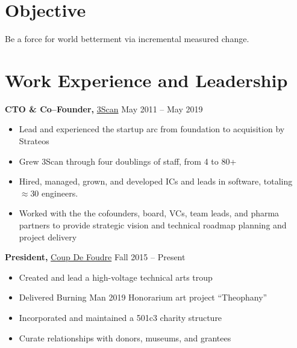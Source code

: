 \documentclass{res}
\begin{document}

\address{{\bf Home Address} \\ 166 Sanchez \#7 \\ San Francisco, CA 94114 \\
        (520) 591-5245 \\ meawoppl@gmail.com }
\address{{\bf Work Address} \\ 951 Hudson Ave \\ San Francisco, CA 94124 \\
        (562) 546-3326 \\ \href{https://meawoppl.github.io}{meawoppl.github.io}}

\begin{resume}

\section{Objective}
Be a force for world betterment via incremental measured change.

\section{Work Experience and Leadership}

{\bf CTO \& Co--Founder,} \href{http://www.3scan.com}{3Scan} \hfill
May 2011 -- May 2019
\begin{itemize}  \itemsep -2pt
  \item Lead and experienced the startup arc from foundation to acquisition by Strateos
  \item Grew 3Scan through four doublings of staff, from 4 to 80+
  \item Hired, managed, grown, and developed ICs and leads in software,
    totaling $\approx30$ engineers.
  \item Worked with the the cofounders, board, VCs, team leads, and pharma partners to provide strategic vision
    and technical roadmap planning and project delivery
\end{itemize}

{\bf President,}  \href{http://coupdefoud.re}{Coup De Foudre} \hfill   Fall 2015 -- Present
\begin{itemize} \itemsep -2pt
  \item Created and lead a high-voltage technical arts troup
  \item Delivered Burning Man 2019 Honorarium art project ``Theophany''
  \item Incorporated and maintained a 501c3 charity structure
  \item Curate relationships with donors, museums, and grantees 
\end{itemize}


\end{resume}
\end{document}
